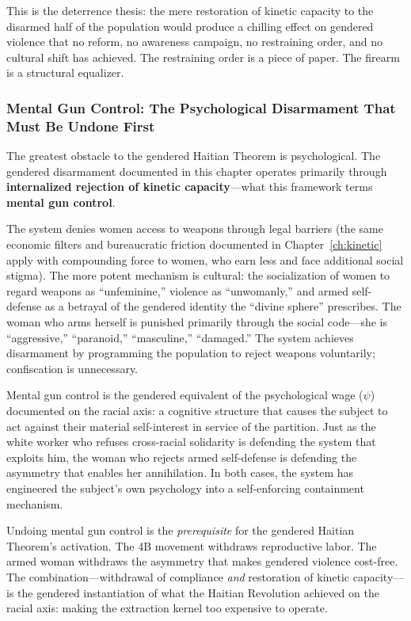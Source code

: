 This is the deterrence thesis: the mere restoration of kinetic capacity to the disarmed half of the population would produce a chilling effect on gendered violence that no reform, no awareness campaign, no restraining order, and no cultural shift has achieved. The restraining order is a piece of paper. The firearm is a structural equalizer.

\subsubsection{Mental Gun Control: The Psychological Disarmament That Must Be Undone First}

The greatest obstacle to the gendered Haitian Theorem is psychological. The gendered disarmament documented in this chapter operates primarily through \textbf{internalized rejection of kinetic capacity}---what this framework terms \textbf{mental gun control}.

The system denies women access to weapons through legal barriers (the same economic filters and bureaucratic friction documented in Chapter~\ref{ch:kinetic} apply with compounding force to women, who earn less and face additional social stigma). The more potent mechanism is cultural: the socialization of women to regard weapons as ``unfeminine,'' violence as ``unwomanly,'' and armed self-defense as a betrayal of the gendered identity the ``divine sphere'' prescribes. The woman who arms herself is punished primarily through the social code---she is ``aggressive,'' ``paranoid,'' ``masculine,'' ``damaged.'' The system achieves disarmament by programming the population to reject weapons voluntarily; confiscation is unnecessary.

Mental gun control is the gendered equivalent of the psychological wage ($\psi$) documented on the racial axis: a cognitive structure that causes the subject to act against their material self-interest in service of the partition. Just as the white worker who refuses cross-racial solidarity is defending the system that exploits him, the woman who rejects armed self-defense is defending the asymmetry that enables her annihilation. In both cases, the system has engineered the subject's own psychology into a self-enforcing containment mechanism.

Undoing mental gun control is the \textit{prerequisite} for the gendered Haitian Theorem's activation. The 4B movement withdraws reproductive labor. The armed woman withdraws the asymmetry that makes gendered violence cost-free. The combination---withdrawal of compliance \textit{and} restoration of kinetic capacity---is the gendered instantiation of what the Haitian Revolution achieved on the racial axis: making the extraction kernel too expensive to operate.

